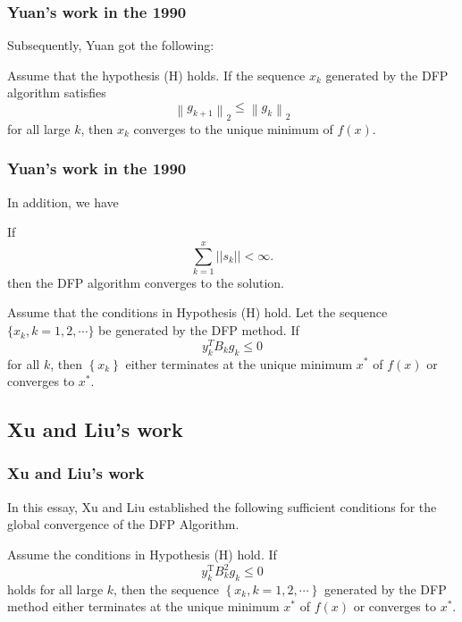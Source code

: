 \documentclass{beamer}
\begin{document}
\begin{frame}
    \frametitle{Yuan's work in the 1990}
    Subsequently, Yuan got the following:
    \begin{theorem}[Yuan,2.2]
       Assume that the hypothesis (H) holds. If the sequence $x_{k}$ generated by the DFP algorithm satisfies
\begin{equation*}
\left\|g_{k+1}\right\|_{2} \leqslant\left\|g_{k}\right\|_{2} \tag{2.21}
\end{equation*}
for all large $k$, then $x_{k}$ converges to the unique minimum of $f(x)$.
    \end{theorem}
    
\end{frame}

\begin{frame}
    \frametitle{Yuan's work in the 1990}
    In addition, we have
        \begin{theorem}[Yuan,2.3]
    If
\begin{equation*}
\sum_{k=1}^{x}| | s_{k}| |<\infty . \tag{2.43}
\end{equation*}
then the DFP algorithm converges to the solution.
    \end{theorem}
    \begin{theorem}[Yuan,2.4]
        Assume that the conditions in Hypothesis (H) hold. Let the sequence $\{x_{k}, k=1,2, \cdots\}$ be generated by the DFP method. If
\begin{equation*}
y_{k}^{T} B_{k} g_{k} \leqslant 0 \tag{2.47}
\end{equation*}
for all $k$, then $\left\{x_{k}\right\}$ either terminates at the unique minimum $x^{*}$ of $f(x)$ or converges to $x^{*}$.
    \end{theorem}
\end{frame}



\subsection{Xu and Liu's work}

\begin{frame}
\frametitle{Xu and Liu's work}
In this essay, Xu and Liu established the following sufficient conditions for the global convergence of the DFP Algorithm.
\begin{theorem}
    Assume the conditions in Hypothesis (H) hold. If \begin{equation*}
        y_k^{\mathrm{T}} B_k^2 g_k \leq 0 \tag{2.10}
    \end{equation*}
holds for all large $k$, then the sequence $\left\{x_k, k=1,2, \cdots\right\}$ generated by the DFP method either terminates at the unique minimum $x^*$ of $f(x)$ or converges to $x^*$.
\end{theorem}
\end{frame}
\end{document}
